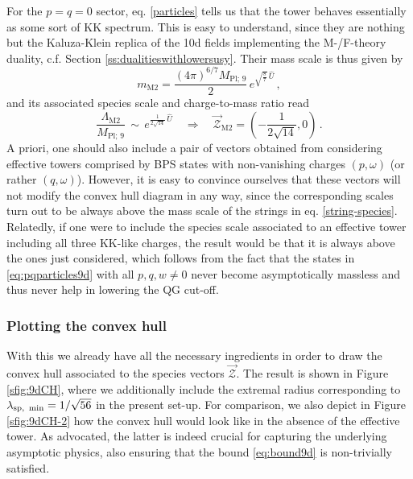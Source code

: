 For the $p=q=0$ sector, eq. \eqref{particles} tells us that the tower behaves essentially as some sort of KK spectrum. This is easy to understand, since they are nothing but the Kaluza-Klein replica of the 10d fields implementing the M-/F-theory duality, c.f. Section \ref{ss:dualitieswithlowersusy}. Their mass scale is thus given by
%
\begin{equation}\label{eq:Ftheorytower}
  m_{\text{M}2} = \frac{(4\pi)^{6/7} M_{\text{Pl};\, 9}}{2}\,  e^{\sqrt{\frac{8}{7}} \, \hat U } \, ,
\end{equation}
%
and its associated species scale and charge-to-mass ratio read
%
\begin{equation}
  \frac{\Lambda_{\text{M}2}}{M_{\text{Pl};\, 9}}\, \sim\, e^{\frac{1}{2\sqrt{14}} \, \hat U } \quad \Longrightarrow \quad \vec{\mathcal{Z}}_{\text{M}2} = \left( -\frac{1}{2\sqrt{14}} , 0\right) \, .
\end{equation}
%
A priori, one should also include a pair of vectors obtained from considering effective towers comprised by BPS states with non-vanishing charges $(p, \omega)$ (or rather $(q, \omega)$). However, it is easy to convince ourselves that these vectors will not modify the convex hull diagram in any way, since the corresponding scales turn out to be always above the mass scale of the strings in eq. \eqref{string-species}. Relatedly, if one were to include the species scale associated to an effective tower including all three KK-like charges, the result would be that it is always above the ones just considered, which follows from the fact that the states in \eqref{eq:pqparticles9d} with all $p,q,w\neq 0$ never become asymptotically massless and thus never help in lowering the QG cut-off. %

\subsubsection*{Plotting the convex hull}

With this we already have all the necessary ingredients in order to draw the convex hull associated to the species vectors $\vec{\mathcal{Z}}$. The result is shown in Figure \ref{sfig:9dCH}, where we additionally include the extremal radius corresponding to $\lambda_{\text{sp,\, min}}=1/\sqrt{56}$ in the present set-up. For comparison, we also depict in Figure \ref{sfig:9dCH-2} how the convex hull would look like in the absence of the effective tower. As advocated, the latter is indeed crucial for capturing the underlying asymptotic physics, also ensuring that the bound \eqref{eq:bound9d} is non-trivially satisfied. 

